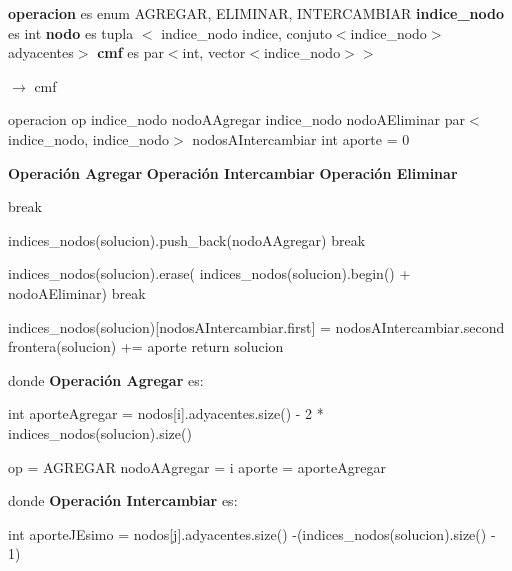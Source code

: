 \documentclass[a4paper, 10pt, twoside]{article}
\newenvironment{pseudo}[1][]{%
    \vspace{1em}%
    \begin{algorithmic}%
}
{%
    \end{algorithmic}%
    \vspace{1em}%
}
\begin{document}
\begin{pseudo}

\State \textbf{operacion} es enum {AGREGAR, ELIMINAR, INTERCAMBIAR}
\State \textbf{indice\_nodo} es int
\State \textbf{nodo} es tupla $<$ indice\_nodo indice, conjuto$<$indice\_nodo$>$ adyacentes$>$
\State \textbf{cmf} es par$<$int, vector$<$indice\_nodo$>>$

\State
{} $\rightarrow$ cmf
	
	\State operacion op
	\State indice\_nodo nodoAAgregar
	\State indice\_nodo nodoAEliminar
	\State par$<$indice\_nodo, indice\_nodo$>$ nodosAIntercambiar
	\State int aporte = 0

	\State
	\State \textbf{Operación Agregar}
	\State
	\State \textbf{Operación Intercambiar}
	\State
	\State \textbf{Operación Eliminar}
	\State

	 break \EndIf

		    \State indices\_nodos(solucion).push\_back(nodoAAgregar)
		    \State break
	    \EndCase

		    \State indices\_nodos(solucion).erase(
		    \State indices\_nodos(solucion).begin() + nodoAEliminar)
		    \State break
	    \EndCase

		    \State indices\_nodos(solucion)[nodosAIntercambiar.first] = nodosAIntercambiar.second
	    \EndCase
	\EndSwitch
	\State
	\State frontera(solucion) += aporte
	\State return solucion

\EndProcedure
\State
\State donde \textbf{Operación Agregar} es:
\State

				\State int aporteAgregar = nodos[i].adyacentes.size() - 2 * indices\_nodos(solucion).size()

					\State op = AGREGAR
					\State nodoAAgregar = i
					\State aporte = aporteAgregar
				\EndIf
			\EndIf
		\EndFor

\State
\State donde \textbf{Operación Intercambiar} es:
\State


					\State int aporteJEsimo = nodos[j].adyacentes.size() -(indices\_nodos(solucion).size() - 1)


\end{pseudo}
\end{document}
